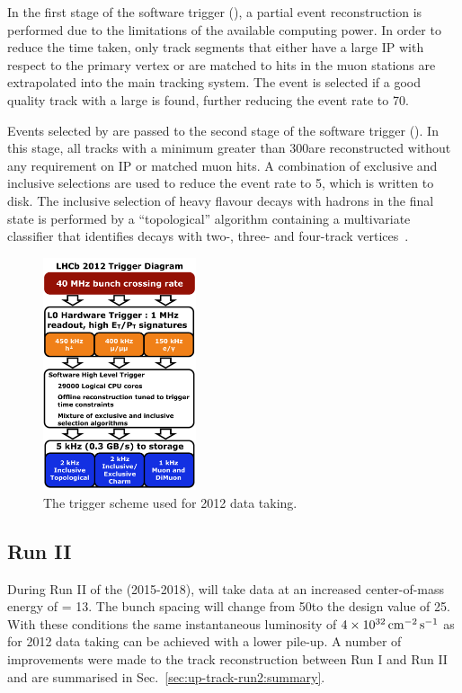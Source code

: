 In the first stage of the software trigger (\hltone), a partial event reconstruction is performed due to the limitations of the available computing power. In order to reduce the time taken, only \velo track segments that either have a large IP with respect to the primary vertex or are matched to hits in the muon stations are extrapolated into the main tracking system. The event is selected if a good quality track with a large \pt is found, further reducing the event rate to 70\khz. 

Events selected by \hltone are passed to the second stage of the software trigger (\hlttwo). In this stage, all tracks with a minimum \pt greater than 300\mevc are reconstructed without any requirement on IP or matched muon hits. A combination of exclusive and inclusive selections are used to reduce the event rate to 5\khz, which is written to disk. The inclusive selection of heavy flavour decays with hadrons in the final state is performed by a  ``topological'' algorithm containing a multivariate classifier that identifies \B decays with two-, three- and four-track vertices~\cite{trigger-inclusive,trigger-topo}.

\begin{figure}[!htb]
\centering
\includegraphics[width=0.4\textwidth]{figs/detector/trigger-runI.pdf}
\caption{The trigger scheme used for 2012 data taking.}
\label{fig:trigger-runI}
\end{figure}

\subsection{\lhcb Run II}
\label{sec:lhcb:lhcb-run2}

During Run II of the \lhc (2015-2018), \lhcb will take data at an increased center-of-mass energy of \sqs = 13\tev. The bunch spacing will change from 50\ns to the design value of 25\ns. With these conditions the same instantaneous luminosity of $4\times10^{32}\mathrm{ \,cm}^{-2}\mathrm{{\,s}}^{-1}$ as for 2012 data taking can be achieved with a lower pile-up. A number of improvements were made to the track reconstruction between Run I and Run II and are summarised in Sec.~\ref{sec:up-track-run2:summary}.

